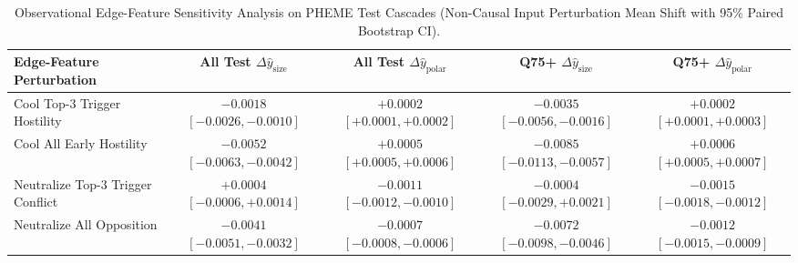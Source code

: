 \begin{table}[t]
\centering
\caption{Observational Edge-Feature Sensitivity Analysis on PHEME Test Cascades (Non-Causal Input Perturbation Mean Shift with 95\% Paired Bootstrap CI).}
\label{tab:mechanisms_pheme}
\begin{tabular}{lcccc}
\toprule
Edge-Feature Perturbation & All Test $\Delta \hat{y}_{\mathrm{size}}$ & All Test $\Delta \hat{y}_{\mathrm{polar}}$ & Q75+ $\Delta \hat{y}_{\mathrm{size}}$ & Q75+ $\Delta \hat{y}_{\mathrm{polar}}$ \\
\midrule
Cool Top-3 Trigger Hostility & $-0.0018$ $[-0.0026, -0.0010]$ & $+0.0002$ $[+0.0001, +0.0002]$ & $-0.0035$ $[-0.0056, -0.0016]$ & $+0.0002$ $[+0.0001, +0.0003]$ \\
Cool All Early Hostility & $-0.0052$ $[-0.0063, -0.0042]$ & $+0.0005$ $[+0.0005, +0.0006]$ & $-0.0085$ $[-0.0113, -0.0057]$ & $+0.0006$ $[+0.0005, +0.0007]$ \\
Neutralize Top-3 Trigger Conflict & $+0.0004$ $[-0.0006, +0.0014]$ & $-0.0011$ $[-0.0012, -0.0010]$ & $-0.0004$ $[-0.0029, +0.0021]$ & $-0.0015$ $[-0.0018, -0.0012]$ \\
Neutralize All Opposition & $-0.0041$ $[-0.0051, -0.0032]$ & $-0.0007$ $[-0.0008, -0.0006]$ & $-0.0072$ $[-0.0098, -0.0046]$ & $-0.0012$ $[-0.0015, -0.0009]$ \\
\bottomrule
\end{tabular}
\end{table}
